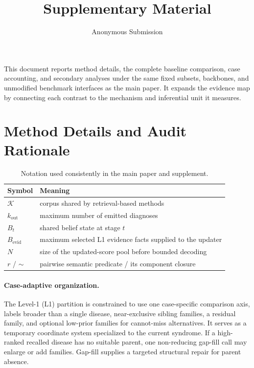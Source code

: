 \documentclass[letterpaper]{article}
\title{Supplementary Material}
\author{Anonymous Submission}
\begin{document}
\maketitle

This document reports method details, the complete baseline comparison, case accounting, and secondary analyses under the same fixed subsets, backbones, and unmodified benchmark interfaces as the main paper.
It expands the evidence map by connecting each contrast to the mechanism and inferential unit it measures.

\section{Method Details and Audit Rationale}

\begin{table}[tb]
\centering
\small
\begin{tabular}{@{}lp{5.0cm}@{}}
\toprule
Symbol & Meaning \\
\midrule
$\mathcal{K}$ & corpus shared by retrieval-based methods \\
$k_{\mathrm{out}}$ & maximum number of emitted diagnoses \\
$B_t$ & shared belief state at stage $t$ \\
$B_{\mathrm{evid}}$ & maximum selected L1 evidence facts supplied to the updater \\
$N$ & size of the updated-score pool before bounded decoding \\
$r$ / $\sim$ & pairwise semantic predicate / its component closure \\
\bottomrule
\end{tabular}
\caption{Notation used consistently in the main paper and supplement.}
\label{tab:notation}
\end{table}

\paragraph{Case-adaptive organization.}
The Level-1 (L1) partition is constrained to use one case-specific comparison axis, labels broader than a single disease, near-exclusive sibling families, a residual family, and optional low-prior families for cannot-miss alternatives.
It serves as a temporary coordinate system specialized to the current syndrome.
If a high-ranked recalled disease has no suitable parent, one non-reducing gap-fill call may enlarge or add families.
Gap-fill supplies a targeted structural repair for parent absence.
\end{document}
